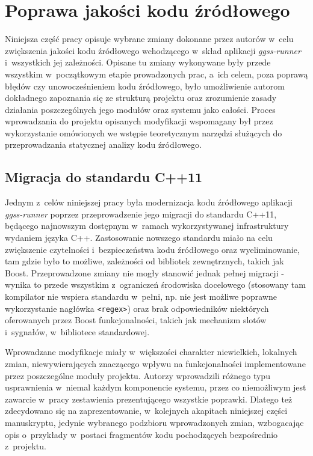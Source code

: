 \clearpage
\section{Poprawa jakości kodu źródłowego}
Niniejsza część pracy opisuje wybrane zmiany dokonane przez autorów w~celu zwiększenia jakości kodu źródłowego wchodzącego w~skład aplikacji \emph{ggss-runner} i~wszystkich jej zależności. Opisane tu zmiany wykonywane były przede wszystkim w~początkowym etapie prowadzonych prac, a~ich celem, poza poprawą błędów czy unowocześnieniem kodu źródłowego, było umożliwienie autorom dokładnego zapoznania się ze strukturą projektu oraz zrozumienie zasady działania poszczególnych jego modułów oraz systemu jako całości. Proces wprowadzania do projektu opisanych modyfikacji wspomagany był przez wykorzystanie omówionych we wstępie teoretycznym narzędzi służących do przeprowadzania statycznej analizy kodu źródłowego. 

\subsection{Migracja do standardu C++11}
Jednym z~celów niniejszej pracy była modernizacja kodu źródłowego aplikacji \emph{ggss-runner} poprzez przeprowadzenie jego migracji do standardu C++11, będącego najnowszym dostępnym w~ramach wykorzystywanej infrastruktury wydaniem języka C++. Zastosowanie nowszego standardu miało na celu zwiększenie czytelności i~bezpieczeństwa kodu źródłowego oraz wyeliminowanie, tam gdzie było to możliwe, zależności od bibliotek zewnętrznych, takich jak Boost. Przeprowadzone zmiany nie mogły stanowić jednak pełnej migracji - wynika to przede wszystkim z~ograniczeń środowiska docelowego (stosowany tam kompilator nie wspiera standardu w~pełni, np. nie jest możliwe poprawne wykorzystanie nagłówka \lstinline{<regex>}) oraz brak odpowiedników niektórych oferowanych przez Boost funkcjonalności, takich jak mechanizm slotów i~sygnałów, w~bibliotece standardowej.

Wprowadzane modyfikacje miały w~większości charakter niewielkich, lokalnych zmian, niewywierających znaczącego wpływu na funkcjonalności implementowane przez poszczególne moduły projektu. Autorzy wprowadzili różnego typu usprawnienia w~niemal każdym komponencie systemu, przez co niemożliwym jest zawarcie w~pracy zestawienia prezentującego wszystkie poprawki. Dlatego też zdecydowano się na zaprezentowanie, w~kolejnych akapitach niniejszej części manuskryptu, jedynie wybranego podzbioru wprowadzonych zmian, wzbogacając opis o~przykłady w~postaci fragmentów kodu pochodzących bezpośrednio z~projektu. 


